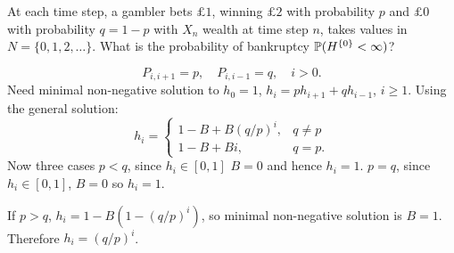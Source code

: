 \documentclass[10pt, a4paper]{article}
\begin{document}
\begin{example}
    At each time step,
    a gambler bets $\pounds 1$,
    winning $\pounds 2$ with probability $p$ and $\pounds 0$ with probability $q = 1 - p$ with $X_n$ wealth at time step $n$,
    takes values in $N = \{0, 1, 2, \dotsc\}$.
    What is the probability of bankruptcy $\P(H ^{\{0\}} < \infty)$?

    \begin{solution}
        \[
        P_{i, i + 1} = p,\quad P_{i, i - 1} = q,\quad i > 0.
        \]
        Need minimal non-negative solution to $h_0 = 1$,
        $h_i = ph_{i + 1} + qh_{i - 1}$,
        $i \geq 1$.
        Using the general solution:
        \[
        h_i = \begin{cases}
            1 - B + B(q / p) ^ i, & q \neq p \\
            1 - B + Bi, & q = p.
        \end{cases}
        \]
        Now three cases $p < q$,
        since $h_i \in [0, 1]$ $B = 0$ and hence $h_i = 1$.
        $p = q$,
        since $h_i \in [0, 1]$,
        $B = 0$ so $h_i = 1$.

        If $p > q$,
        $h_i = 1 - B(1 - (q / p) ^ i)$,
        so minimal non-negative solution is $B = 1$.
        Therefore $h_i = (q / p) ^ i$.
    \end{solution}
\end{example}
\end{document}
